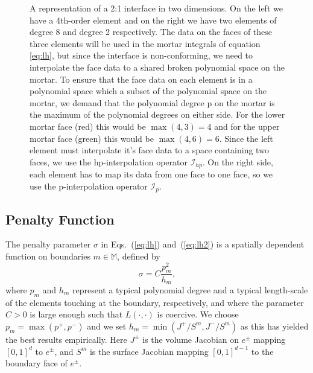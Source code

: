\begin{figure}
\medskip
\caption{A representation of a 2:1 interface in two dimensions. On the
  left we have a 4th-order element and on the right we have two
  elements of degree 8 and degree 2 respectively. The data on the
  faces of these three elements will be used in the mortar integrals
  of equation \ref{eq:lh}, but since the interface is
  non-conforming, we need to interpolate the face data to a shared
  broken polynomial space on the mortar. To ensure that the face data
  on each element is in a polynomial space which a subset of the
  polynomial space on the mortar, we demand that the polynomial degree
  p on the mortar is the maximum of the polynomial degrees on either
  side. For the lower mortar face (red) this would be $\max(4,3) = 4$
  and for the upper mortar face (green) this would be $\max(4,6) = 6$.
  Since the left element must interpolate it's face data to a
  space containing two faces, we use the hp-interpolation operator
  $\mathcal{I}_{hp}$. On the right side, each element has to map its
  data from one face to one face, so we use the p-interpolation
  operator $\mathcal{I}_p$.}
\end{figure}



\subsection{Penalty Function}

The penalty parameter $\sigma$ in Eqs.~(\ref{eq:lh}) and~(\ref{eq:lh2}) is a spatially dependent function on boundaries $m\in\mathbb{M}$, defined by
\begin{equation}
\label{eq:penaltyparameter}
\sigma = C\frac{p_{m}^{2}}{h_{m}},
\end{equation}
where $p_m$ and $h_m$ represent a typical polynomial degree and a typical length-scale of the elements touching at the boundary, respectively,  and where the parameter $C>0$ is large enough such
that $L\left(\cdot, \cdot\right)$ is coercive. We choose $p_{m} = \max(p^+,p^-)$
and we set $h_{m} = \min(J^{+}/S^m,J^{-}/S^m)$ as this has yielded the best results empirically. Here $J^{\pm}$ is the
volume Jacobian on $e^\pm$ mapping $[0,1]^d$ to $e^\pm$, and $S^m$ is the
surface Jacobian mapping $[0,1]^{d-1}$ to the boundary face of $e^\pm$.
  

